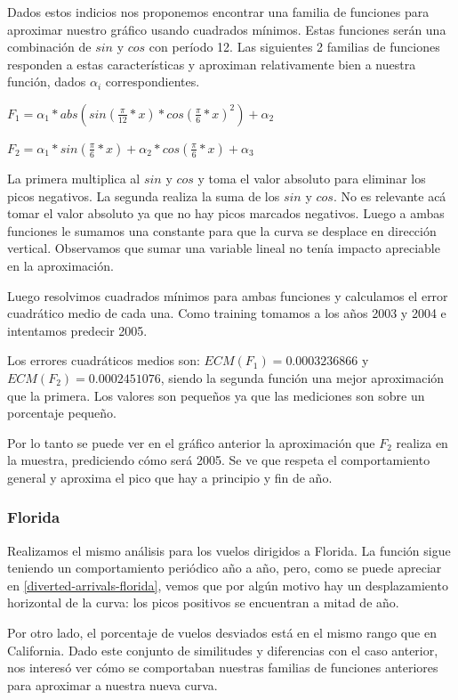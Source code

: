 Dados estos indicios nos proponemos encontrar una familia de funciones para aproximar nuestro gr\'afico usando cuadrados m\'inimos. Estas funciones ser\'an una combinaci\'on de $sin$ y $cos$ con per\'iodo 12. Las siguientes 2 familias de funciones responden a estas caracter\'isticas y aproximan relativamente bien a nuestra funci\'on, dados $\alpha_{i}$ correspondientes.


$F_1 = \alpha_1 * abs(sin(\frac{\pi}{12}*x) * cos(\frac{\pi}{6}*x)^2) + \alpha_2$

$F_2 = \alpha_1 * sin(\frac{\pi}{6}*x) + \alpha_2 * cos(\frac{\pi}{6}*x) + \alpha_3$


La primera multiplica al $sin$ y $cos$ y toma el valor absoluto para eliminar los picos negativos. La segunda realiza la suma de los $sin$ y $cos$. No es relevante ac\'a tomar el valor absoluto ya que no hay picos marcados negativos. Luego a ambas funciones le sumamos una constante para que la curva se desplace en direcci\'on vertical. Observamos que sumar una variable lineal no ten\'ia impacto apreciable en la aproximaci\'on. 

Luego resolvimos cuadrados m\'inimos para ambas funciones y calculamos el error cuadr\'atico medio de cada una. Como training tomamos a los a\~nos 2003 y 2004 e intentamos predecir 2005.

Los errores cuadr\'aticos medios son: $ECM(F_1) = 0.0003236866$ y $ECM(F_2) = 0.0002451076$, siendo la segunda funci\'on una mejor aproximaci\'on que la primera. Los valores son peque\~nos ya que las mediciones son sobre un porcentaje peque\~no.

Por lo tanto se puede ver en el gr\'afico anterior la aproximaci\'on que $F_2$ realiza en la muestra, prediciendo c\'omo ser\'a 2005. Se ve que respeta el comportamiento general y aproxima el pico que hay a principio y fin de a\~no.

\subsubsection{Florida}

Realizamos el mismo an\'alisis para los vuelos dirigidos a Florida. La funci\'on sigue teniendo un comportamiento peri\'odico a\~no a a\~no, pero, como se puede apreciar en \ref{diverted-arrivals-florida}, vemos que por alg\'un motivo hay un desplazamiento horizontal de la curva: los picos positivos se encuentran a mitad de a\~no.

Por otro lado, el porcentaje de vuelos desviados est\'a en el mismo rango que en California.
Dado este conjunto de similitudes y diferencias con el caso anterior, nos interes\'o ver c\'omo se comportaban nuestras familias de funciones anteriores para aproximar a nuestra nueva curva.

